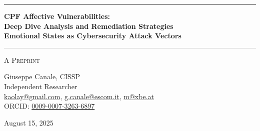 \documentclass[11pt,a4paper]{article}
\begin{document}
\thispagestyle{empty}
\begin{center}

\vspace*{0.5cm}

\rule{\textwidth}{1.5pt}

\vspace{0.5cm}

{\LARGE \textbf{CPF Affective Vulnerabilities:}}\\[0.3cm]
{\LARGE \textbf{Deep Dive Analysis and Remediation Strategies}}\\[0.3cm]
{\LARGE \textbf{Emotional States as Cybersecurity Attack Vectors}}

\vspace{0.5cm}

\rule{\textwidth}{1.5pt}

\vspace{0.3cm}

{\large \textsc{A Preprint}}

\vspace{0.5cm}

{\Large Giuseppe Canale, CISSP}\\[0.2cm]
Independent Researcher\\[0.1cm]
\href{mailto:kaolay@gmail.com}{kaolay@gmail.com}, 
\href{mailto:g.canale@escom.it}{g.canale@escom.it}, 
\href{mailto:m8xbe.at}{m@xbe.at}\\[0.1cm]
ORCID: \href{https://orcid.org/0009-0007-3263-6897}{0009-0007-3263-6897}

\vspace{0.8cm}

{\large August 15, 2025}

\vspace{1cm}

\end{center}
\end{document}

